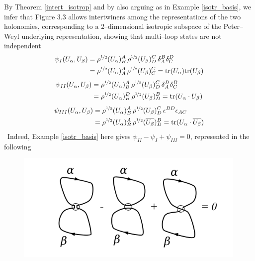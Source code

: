 By Theorem \ref{intert_isotrop} and by also arguing as in Example \ref{isotr_basis}, we infer that Figure 3.3 allows intertwiners among the representations of the two holonomies, corresponding to a $2$--dimensional isotropic subspace of the Peter--Weyl underlying representation, showing that multi--loop states are not independent
\begin{align*}
    \psi_I(U_\alpha,U_\beta)&=\rho^{\nicefrac{1}{2}}(U_\alpha)^A_B\,\rho^{\nicefrac{1}{2}}(U_\beta)^C_D\,\delta^B_A\delta^D_C\\
    &=\rho^{\nicefrac{1}{2}}(U_\alpha)^A_A\,\rho^{\nicefrac{1}{2}}(U_\beta)^C_C=\text{\normalfont tr}(U_\alpha)\text{\normalfont tr}(U_\beta)
\end{align*}
\begin{align*}
    \psi_{II}(U_\alpha,U_\beta)&=\rho^{\nicefrac{1}{2}}(U_\alpha)^A_B\,\rho^{\nicefrac{1}{2}}(U_\beta)^C_D\,\delta^D_A\delta^B_C\\
    &=\rho^{\nicefrac{1}{2}}(U_\alpha)^D_B\,\rho^{\nicefrac{1}{2}}(U_\beta)^B_D=\text{\normalfont tr}(U_\alpha\cdot U_\beta)
\end{align*}
\begin{align*}
    \psi_{III}(U_\alpha,U_\beta)&=\rho^{\nicefrac{1}{2}}(U_\alpha)^A_B\,\rho^{\nicefrac{1}{2}}(U_\beta)^C_D\,\epsilon^{BD}\epsilon_{AC}\\
    &=\rho^{\nicefrac{1}{2}}(U_\alpha)^A_B\,\rho^{\nicefrac{1}{2}}(\overline{U_\beta})^B_D=\text{\normalfont tr}(U_\alpha\cdot\overline{U_\beta})
\end{align*}
\,\newline
 Indeed, Example \ref{isotr_basis} here gives $\psi_{II}-\psi_I+\psi_{III}=0$, represented in the following

\begin{figure}[ht]
    \centering
    \includegraphics[scale=0.6]{images/multiloops.png}
\end{figure}
 
